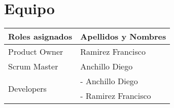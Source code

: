 \chapter{Equipo}

\begin{table}[htbp]
	\begin{center}
		\begin{tabular}{| p{5.2cm}| p{5.2cm} |}
			\hline
			\textbf{Roles asignados} & \textbf {Apellidos y Nombres}\\
			\hline
			Product Owner & Ramirez Francisco \\ \hline
			Scrum Master & Anchillo Diego \\ \hline \hline
			\multirow{2}{1cm}{Developers} & - Anchillo Diego \\
			& - Ramirez Francisco \\ \hline
		\end{tabular}
	\end{center}
\end{table}